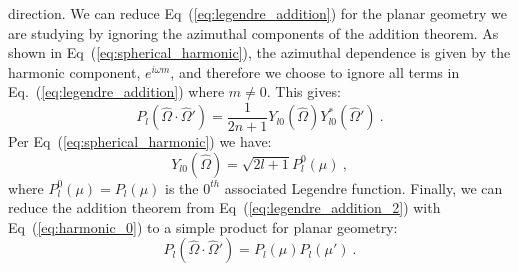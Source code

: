 direction. We can reduce Eq~(\ref{eq:legendre_addition}) for the
planar geometry we are studying by ignoring the azimuthal components
of the addition theorem. As shown in Eq~(\ref{eq:spherical_harmonic}),
the azimuthal dependence is given by the harmonic component, $e^{i
  \omega m}$, and therefore we choose to ignore all terms in
Eq.~(\ref{eq:legendre_addition}) where $m \neq 0$. This gives:
\begin{equation}
  P_l(\hat{\Omega} \cdot \hat{\Omega}') = \frac{1}{2n+1}
  Y_{l0}(\hat{\Omega})Y^*_{l0}(\hat{\Omega}')\:.
  \label{eq:legendre_addition_2}
\end{equation}
Per Eq~(\ref{eq:spherical_harmonic}) we have:
\begin{equation}
  Y_{l0}(\hat{\Omega}) = \sqrt{2l+1}P_l^0(\mu)\:,
  \label{eq:harmonic_0}
\end{equation}
where $P_l^0(\mu) = P_l(\mu)$ is the $0^{th}$ associated Legendre
function. Finally, we can reduce the addition theorem from
Eq~(\ref{eq:legendre_addition_2}) with Eq~(\ref{eq:harmonic_0}) to a
simple product for planar geometry:
\begin{equation}
  P_l(\hat{\Omega} \cdot \hat{\Omega}') = P_l(\mu)P_l(\mu')\:.
  \label{eq:legendre_addition_3}
\end{equation}

